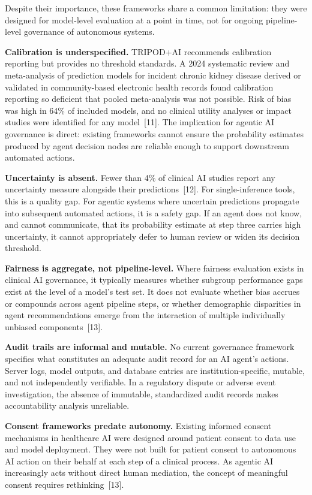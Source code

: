 \documentclass[11pt]{article}
\begin{document}
Despite their importance, these frameworks share a common limitation:
they were designed for model-level evaluation at a point in time, not
for ongoing pipeline-level governance of autonomous systems.

\textbf{Calibration is underspecified.} TRIPOD+AI recommends calibration
reporting but provides no threshold standards. A 2024 systematic review
and meta-analysis of prediction models for incident chronic kidney
disease derived or validated in community-based electronic health
records found calibration reporting so deficient that pooled
meta-analysis was not possible. Risk of bias was high in 64\% of
included models, and no clinical utility analyses or impact studies were
identified for any model~{[}11{]}. The implication for agentic AI
governance is direct: existing frameworks cannot ensure the probability
estimates produced by agent decision nodes are reliable enough to
support downstream automated actions.

\textbf{Uncertainty is absent.} Fewer than 4\% of clinical AI studies
report any uncertainty measure alongside their predictions~{[}12{]}. For
single-inference tools, this is a quality gap. For agentic systems where
uncertain predictions propagate into subsequent automated actions, it is
a safety gap. If an agent does not know, and cannot communicate, that
its probability estimate at step three carries high uncertainty, it
cannot appropriately defer to human review or widen its decision
threshold.

\textbf{Fairness is aggregate, not pipeline-level.} Where fairness
evaluation exists in clinical AI governance, it typically measures
whether subgroup performance gaps exist at the level of a model's test
set. It does not evaluate whether bias accrues or compounds across agent
pipeline steps, or whether demographic disparities in agent
recommendations emerge from the interaction of multiple individually
unbiased components~{[}13{]}.

\textbf{Audit trails are informal and mutable.} No current governance
framework specifies what constitutes an adequate audit record for an AI
agent's actions. Server logs, model outputs, and database entries are
institution-specific, mutable, and not independently verifiable. In a
regulatory dispute or adverse event investigation, the absence of
immutable, standardized audit records makes accountability analysis
unreliable.

\textbf{Consent frameworks predate autonomy.} Existing informed consent
mechanisms in healthcare AI were designed around patient consent to data
use and model deployment. They were not built for patient consent to
autonomous AI action on their behalf at each step of a clinical process.
As agentic AI increasingly acts without direct human mediation, the
concept of meaningful consent requires rethinking~{[}13{]}.
\end{document}
